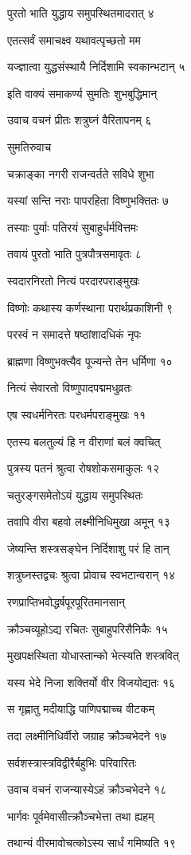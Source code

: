 पुरतो भाति युद्धाय समुपस्थितमादरात् ४

एतत्सर्वं समाचक्ष्व यथावत्पृच्छतो मम

यज्ज्ञात्वा युद्धसंस्थायै निर्दिशामि स्वकान्भटान् ५

इति वाक्यं समाकर्ण्य सुमतिः शुभबुद्धिमान्

उवाच वचनं प्रीतः शत्रुघ्नं वैरितापनम् ६

सुमतिरुवाच

चक्राङ्का नगरी राजन्वर्तते सविधे शुभा

यस्यां सन्ति नराः पापरहिता विष्णुभक्तितः ७

तस्याः पुर्याः पतिरयं सुबाहुर्धर्मवित्तमः

तवायं पुरतो भाति पुत्रपौत्रसमावृतः ८

स्वदारनिरतो नित्यं परदारपराङ्मुखः

विष्णोः कथास्य कर्णस्थाना परार्थप्रकाशिनी ९

परस्वं न समादत्ते षष्ठांशादधिकं नृपः

ब्राह्मणा विष्णुभक्त्यैव पूज्यन्ते तेन धर्मिणा १०

नित्यं सेवारतो विष्णुपादपद्ममधुव्रतः

एष स्वधर्मनिरतः परधर्मपराङ्मुखः ११

एतस्य बलतुल्यं हि न वीराणां बलं क्वचित्

पुत्रस्य पतनं श्रुत्वा रोषशोकसमाकुलः १२

चतुरङ्गसमेतोऽयं युद्धाय समुपस्थितः

तवापि वीरा बहवो लक्ष्मीनिधिमुखा अमून् १३

जेष्यन्ति शस्त्रसङ्घेन निर्दिशाशु परं हि तान्

शत्रुघ्नस्तद्वचः श्रुत्वा प्रोवाच स्वभटान्वरान् १४

रणप्राप्तिभवोद्धर्षपूरपूरितमानसान्

क्रौञ्चव्यूहोऽद्य रचितः सुबाहुपरिसैनिकैः १५

मुखपक्षस्थिता योधास्तान्को भेत्स्यति शस्त्रवित्

यस्य भेदे निजा शक्तिर्यो वीर विजयोद्यतः १६

स गृह्णातु मदीयाद्धि पाणिपद्माच्च वीटकम्

तदा लक्ष्मीनिधिर्वीरो जग्राह क्रौञ्चभेदने १७

सर्वशस्त्रास्त्रविद्वीरैर्बहुभिः परिवारितः

उवाच वचनं राजन्यास्येऽहं क्रौञ्चभेदने १८

भार्गवः पूर्वमेवासीत्क्रौञ्चभेत्ता तथा ह्यहम्

तथान्यं वीरमावोचत्कोऽस्य सार्धं गमिष्यति १९

